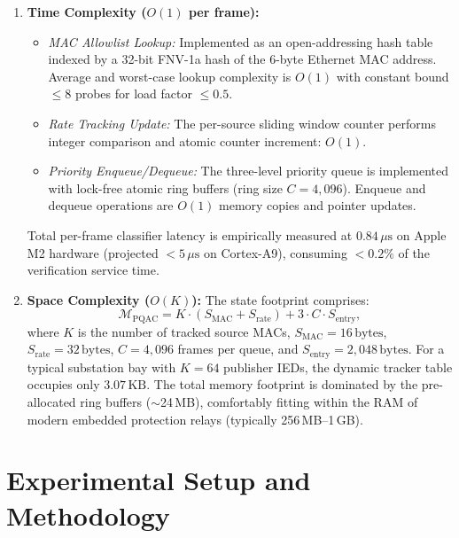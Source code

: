 \documentclass{ieeeaccess}
\begin{document}
\begin{enumerate}[leftmargin=*]
    \item \textbf{Time Complexity ($O(1)$ per frame):} 
    \begin{itemize}[leftmargin=*]
        \item \emph{MAC Allowlist Lookup:} Implemented as an open-addressing hash table indexed by a 32-bit FNV-1a hash of the 6-byte Ethernet MAC address. Average and worst-case lookup complexity is $O(1)$ with constant bound $\le 8$ probes for load factor $\le 0.5$.
        \item \emph{Rate Tracking Update:} The per-source sliding window counter performs integer comparison and atomic counter increment: $O(1)$.
        \item \emph{Priority Enqueue/Dequeue:} The three-level priority queue is implemented with lock-free atomic ring buffers (ring size $C = 4{,}096$). Enqueue and dequeue operations are $O(1)$ memory copies and pointer updates.
    \end{itemize}
    Total per-frame classifier latency is empirically measured at $0.84\,\mu\text{s}$ on Apple M2 hardware (projected $<5\,\mu\text{s}$ on Cortex-A9), consuming $<0.2\%$ of the verification service time.

    \item \textbf{Space Complexity ($O(K)$):} 
    The state footprint comprises:
    \begin{equation}
    \mathcal{M}_{\text{PQAC}} = K \cdot (S_{\text{MAC}} + S_{\text{rate}}) + 3 \cdot C \cdot S_{\text{entry}},
    \end{equation}
    where $K$ is the number of tracked source MACs, $S_{\text{MAC}} = 16\,\text{bytes}$, $S_{\text{rate}} = 32\,\text{bytes}$, $C = 4{,}096$ frames per queue, and $S_{\text{entry}} = 2{,}048\,\text{bytes}$. For a typical substation bay with $K = 64$ publisher IEDs, the dynamic tracker table occupies only $3.07\,\text{KB}$. The total memory footprint is dominated by the pre-allocated ring buffers ($\sim$24\,MB), comfortably fitting within the RAM of modern embedded protection relays (typically 256\,MB--1\,GB).
\end{enumerate}

\section{Experimental Setup and Methodology}
\end{document}
